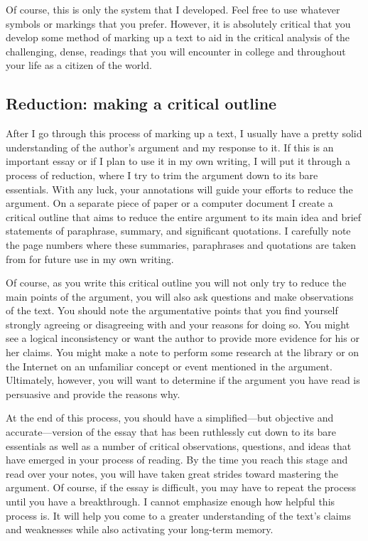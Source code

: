 Of course, this is only the system that I developed. Feel free to use whatever symbols or markings that you prefer. However, it is absolutely critical that you develop some method of marking up a text to aid in the critical analysis of the challenging, dense, readings that you will encounter in college and throughout your life as a citizen of the world.

\subsection{Reduction: making a critical outline}

After I go through this process of marking up a text, I usually have a pretty solid understanding of the author's argument and my response to it. If this is an important essay or if I plan to use it in my own writing, I will put it through a process of reduction, where I try to trim the argument down to its bare essentials. With any luck, your annotations will guide your efforts to reduce the argument. On a separate piece of paper or a computer document I create a critical outline that aims to reduce the entire argument to its main idea and brief statements of paraphrase, summary, and significant quotations. I carefully note the page numbers where these summaries, paraphrases and quotations are taken from for future use in my own writing.

Of course, as you write this critical outline you will not only try to reduce the main points of the argument, you will also ask questions and make observations of the text. You should note the argumentative points that you find yourself strongly agreeing or disagreeing with and your reasons for doing so. You might see a logical inconsistency or want the author to provide more evidence for his or her claims. You might make a note to perform some research at the library or on the Internet on an unfamiliar concept or event mentioned in the argument. Ultimately, however, you will want to determine if the argument you have read is persuasive and provide the reasons why.

At the end of this process, you should have a simplified---but objective and accurate---version of the essay that has been ruthlessly cut down to its bare essentials as well as a number of critical observations, questions, and ideas that have emerged in your process of reading. By the time you reach this stage and read over your notes, you will have taken great strides toward mastering the argument. Of course, if the essay is difficult, you may have to repeat the process until you have a breakthrough. I cannot emphasize enough how helpful this process is. It will help you come to a greater understanding of the text’s claims and weaknesses while also activating your long-term memory.


